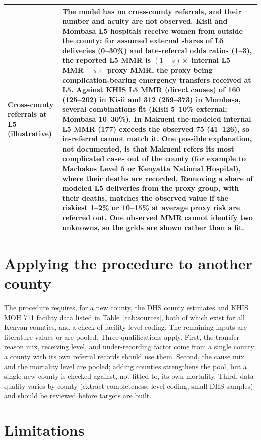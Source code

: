 \documentclass[11pt]{article}
\begin{document}
\begin{longtable}{>{\raggedright\arraybackslash}p{} >{\raggedright\arraybackslash}p{}}
Cross-county referrals at L5 (illustrative) & The model has no cross-county referrals, and their number and acuity are not observed. Kisii and Mombasa L5 hospitals receive women from outside the county: for assumed external shares of L5 deliveries (0--30\%) and late-referral odds ratios (1--3), the reported L5 MMR is $(1-s)\times$ internal L5 MMR $+\ s\times$ proxy MMR, the proxy being complication-bearing emergency transfers received at L5. Against KHIS L5 MMR (direct causes) of 160 (125--202) in Kisii and 312 (259--373) in Mombasa, several combinations fit (Kisii 5--10\% external; Mombasa 10--30\%). In Makueni the modeled internal L5 MMR (177) exceeds the observed 75 (41--126), so in-referral cannot match it. One possible explanation, not documented, is that Makueni refers its most complicated cases out of the county (for example to Machakos Level 5 or Kenyatta National Hospital), where their deaths are recorded. Removing a share of modeled L5 deliveries from the proxy group, with their deaths, matches the observed value if the riskiest 1--2\% or 10--15\% at average proxy risk are referred out. One observed MMR cannot identify two unknowns, so the grids are shown rather than a fit. \\
\bottomrule
\end{longtable}

\section{Applying the procedure to another county}

The procedure requires, for a new county, the DHS county estimates and KHIS
MOH 711 facility data listed in Table~\ref{tab:sources}, both of which exist for
all Kenyan counties, and a check of facility level coding. The remaining
inputs are literature values or are pooled. Three qualifications apply. First,
the transfer-reason mix, receiving level, and under-recording factor come from
a single county; a county with its own referral records should use them. Second, the
cause mix and the mortality level are pooled; adding counties strengthens the
pool, but a single new county is checked against, not fitted to, its own
mortality. Third, data quality varies by county (extract completeness, level
coding, small DHS samples) and should be reviewed before targets are built.

\section{Limitations}
\end{document}
